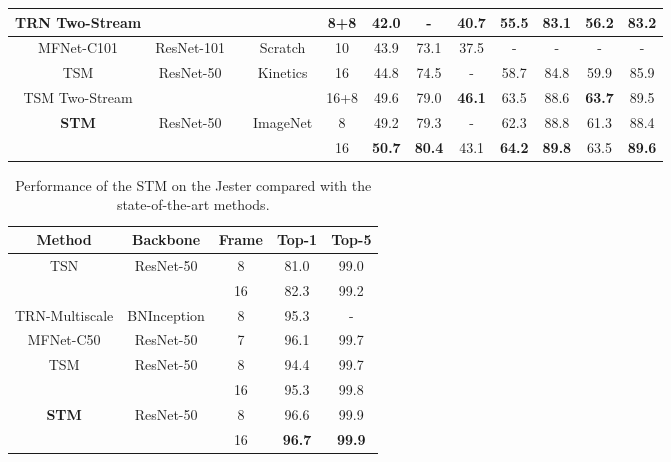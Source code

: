 \documentclass[10pt,twocolumn,letterpaper]{article}
\begin{document}
\begin{table*}[htbp]
\begin{adjustbox}{max width=\textwidth}
\begin{threeparttable}
\begin{tabular}{c|c|c|c|c|c|c|c|c|c|c|c}
					TRN Two-Stream \cite{zhou2018temporal} &  & \checkmark & & 8+8 & 42.0 & - & 40.7 & 55.5 & 83.1 & 56.2 & 83.2\tabularnewline
					\hline
					MFNet-C101 \cite{lee2018motion} & ResNet-101 & & Scratch & 10 & 43.9 & 73.1 & 37.5 & - & - & - & -\tabularnewline
					\hline
					TSM \cite{lin2018temporal} & \multirow{2}{*}{ResNet-50} & & \multirow{2}{*}{Kinetics} & 16 & 44.8 & 74.5 & - & 58.7 & 84.8 & 59.9 & 85.9\tabularnewline
					TSM Two-Stream \cite{lin2018temporal} &   & \checkmark&  & 16+8 & 49.6 & 79.0 & \textbf{46.1} & 63.5 & 88.6 & \textbf{63.7} & 89.5\tabularnewline
					\hline
					\multirow{2}{*}{\textbf{STM}} & \multirow{2}{*}{ResNet-50} & & \multirow{2}{*}{ImageNet} & 8 & 49.2 & 79.3 & - & 62.3 & 88.8 & 61.3 & 88.4\tabularnewline
					&  & &   & 16 & \textbf{50.7} & \textbf{80.4} & 43.1 & \textbf{64.2} & \textbf{89.8} & 63.5 & \textbf{89.6}\tabularnewline
					\hline
				\end{tabular}\end{threeparttable}
		\end{adjustbox}
	\end{table*}
	
	
	\begin{table}[htbp]
		\centering
		\caption{Performance of the STM on the Jester compared with the state-of-the-art methods.}
		\label{jester}
		\begin{adjustbox}{max width=\columnwidth}
			\begin{threeparttable}
				\begin{tabular}{c|c|c|c|c}
					\hline
					Method & Backbone & Frame & Top-1 & Top-5\tabularnewline
					\hline
					\hline
					\multirow{2}{*}{TSN \cite{wang2016temporal}} & \multirow{2}{*}{ResNet-50} & 8 & 81.0 & 99.0\tabularnewline
					
					&   & 16 & 82.3 & 99.2\tabularnewline
					\hline
					TRN-Multiscale \cite{zhou2018temporal} & BNInception & 8 & 95.3 & -\tabularnewline
					\hline
					MFNet-C50 \cite{lee2018motion} & ResNet-50 & 7 & 96.1 & 99.7\tabularnewline
					\hline
					\multirow{2}{*}{TSM \cite{lin2018temporal}} & \multirow{2}{*}{ResNet-50} & 8 & 94.4 & 99.7\tabularnewline
					&  & 16 & 95.3 & 99.8\tabularnewline
					\hline
					\multirow{2}{*}{\textbf{STM}} & \multirow{2}{*}{ResNet-50} & 8 & 96.6 & 99.9\tabularnewline
					&  & 16 & \textbf{96.7} & \textbf{99.9}\tabularnewline
					\hline
				\end{tabular}\end{threeparttable}
		\end{adjustbox}
	\end{table}
\end{document}
